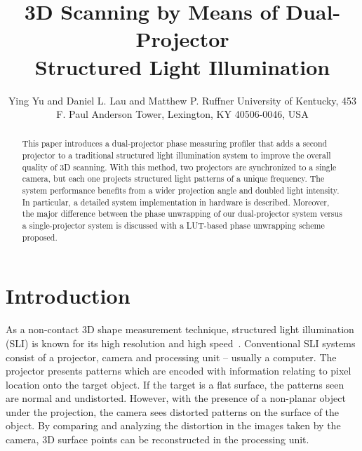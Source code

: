 \documentclass[]{spie}  %
\title{3D Scanning by Means of Dual-Projector \\ Structured Light Illumination}
\author{Ying Yu\supit{a} and Daniel L. Lau\supit{a} and Matthew P. Ruffner\supit{a}
\skiplinehalf
\supit{a}University of Kentucky, 453 F. Paul Anderson Tower, Lexington, KY 40506-0046, USA
}
\begin{document}
 
  \maketitle 

\begin{abstract}
This paper introduces a dual-projector phase measuring profiler that adds a second projector to a traditional structured light illumination system to improve the overall quality of 3D scanning. With this method, two projectors are synchronized to a single camera, but each one projects structured light patterns of a unique frequency. The system performance benefits from a wider projection angle and doubled light intensity. In particular, a detailed system implementation in hardware is described. Moreover, the major difference between the phase unwrapping of our dual-projector system versus a single-projector system is discussed with a LUT-based phase unwrapping scheme proposed. 
\end{abstract}



\section{Introduction}
\label{sec:intro}  %
As a non-contact 3D shape measurement technique, structured light illumination (SLI) is known for its high resolution and high speed~\cite{chen00}. Conventional SLI systems consist of a projector, camera and processing unit -- usually a computer. The projector presents patterns which are encoded with information relating to pixel location onto the target object. If the target is a flat surface, the patterns seen are normal and undistorted. However, with the presence of a non-planar object under the projection, the camera sees distorted patterns on the surface of the object. By comparing and analyzing the distortion in the images taken by the camera, 3D surface points can be reconstructed in the processing unit.
\end{document}
